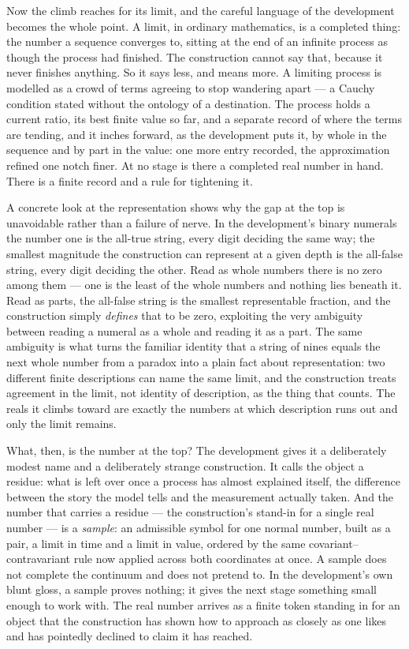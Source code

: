 Now the climb reaches for its limit, and the careful language of the development becomes the whole
point. A limit, in ordinary mathematics, is a completed thing: the number a sequence converges to,
sitting at the end of an infinite process as though the process had finished. The construction cannot
say that, because it never finishes anything. So it says less, and means more. A limiting process is
modelled as a crowd of terms agreeing to stop wandering apart --- a Cauchy condition stated without
the ontology of a destination. The process holds a current ratio, its best finite value so far, and a
separate record of where the terms are tending, and it inches forward, as the development puts it, by
whole in the sequence and by part in the value: one more entry recorded, the approximation refined one
notch finer. At no stage is there a completed real number in hand. There is a finite record and a rule
for tightening it.

A concrete look at the representation shows why the gap at the top is unavoidable rather than a failure
of nerve. In the development's binary numerals the number one is the all-true string, every digit
deciding the same way; the smallest magnitude the construction can represent at a given depth is the
all-false string, every digit deciding the other. Read as whole numbers there is no zero among them ---
one is the least of the whole numbers and nothing lies beneath it. Read as parts, the all-false string
is the smallest representable fraction, and the construction simply \emph{defines} that to be zero,
exploiting the very ambiguity between reading a numeral as a whole and reading it as a part. The same
ambiguity is what turns the familiar identity that a string of nines equals the next whole number from
a paradox into a plain fact about representation: two different finite descriptions can name the same
limit, and the construction treats agreement in the limit, not identity of description, as the thing
that counts. The reals it climbs toward are exactly the numbers at which description runs out and only
the limit remains.

What, then, is the number at the top? The development gives it a deliberately modest name and a
deliberately strange construction. It calls the object a residue: what is left over once a process has
almost explained itself, the difference between the story the model tells and the measurement actually
taken. And the number that carries a residue --- the construction's stand-in for a single real number
--- is a \emph{sample}: an admissible symbol for one normal number, built as a pair, a limit in time
and a limit in value, ordered by the same covariant--contravariant rule now applied across both
coordinates at once. A sample does not complete the continuum and does not pretend to. In the
development's own blunt gloss, a sample proves nothing; it gives the next stage something small enough
to work with. The real number arrives as a finite token standing in for an object that the
construction has shown how to approach as closely as one likes and has pointedly declined to claim it
has reached.

